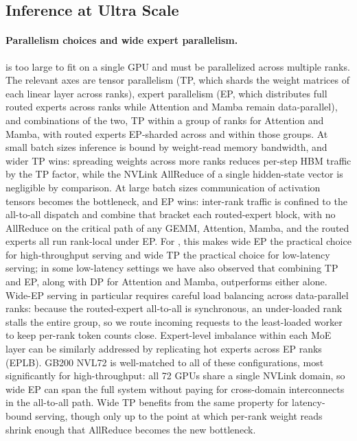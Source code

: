 \subsection{Inference at Ultra Scale}
\label{sec:inference:ultra-scale}

\paragraph{Parallelism choices and wide expert parallelism.}
\ourmodel{} is too large to fit on a single GPU and must be parallelized across
multiple ranks. The relevant axes are tensor parallelism (TP, which shards
the weight matrices of each linear layer across ranks), expert parallelism
(EP, which distributes full routed experts across ranks while Attention
and Mamba remain data-parallel), and combinations of the two, TP within
a group of ranks for Attention and Mamba, with routed experts EP-sharded
across and within those groups.
At small batch sizes inference is bound by weight-read memory bandwidth,
and wider TP wins: spreading weights across more ranks reduces per-step
HBM traffic by the TP factor, while the NVLink AllReduce of a single
hidden-state vector is negligible by comparison. At large batch sizes
communication of activation tensors becomes the bottleneck, and EP wins:
inter-rank traffic is confined to the all-to-all dispatch and combine that
bracket each routed-expert block, with no AllReduce on the critical path
of any GEMM, Attention, Mamba, and the routed experts all run
rank-local under EP.
For \ourmodel{}, this makes wide EP the practical choice for high-throughput
serving and wide TP the practical choice for low-latency serving; in some
low-latency settings we have also observed that combining TP and EP, 
along with DP for Attention and Mamba, outperforms either alone. Wide-EP serving in particular requires careful
load balancing across data-parallel ranks: because the routed-expert
all-to-all is synchronous, an under-loaded rank stalls the entire group,
so we route incoming requests to the least-loaded worker to keep per-rank
token counts close. Expert-level imbalance within each MoE layer can be
similarly addressed by replicating hot experts across EP ranks (EPLB). GB200 NVL72 is well-matched to all of these
configurations, most significantly for high-throughput: all 72 GPUs share
a single NVLink domain, so wide EP can span the full system without paying
for cross-domain interconnects in the all-to-all path. Wide TP benefits
from the same property for latency-bound serving, though only up to the
point at which per-rank weight reads shrink enough that AllReduce
becomes the new bottleneck.


